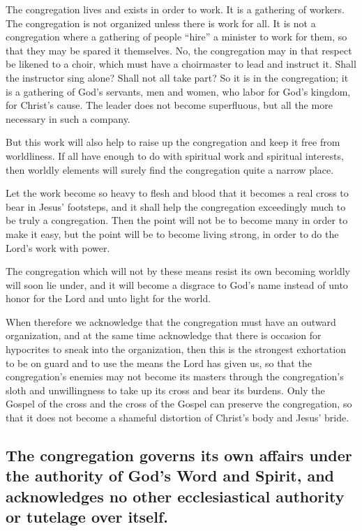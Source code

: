 The congregation lives and exists in order to work. It is a gathering of workers. The congregation is not organized unless there is work for all. It is not a congregation where a gathering of people “hire” a minister to work for them, so that they may be spared it themselves. No, the congregation may in that respect be likened to a choir, which must have a choirmaster to lead and instruct it. Shall the instructor sing alone? Shall not all take part? So it is in the congregation; it is a gathering of God’s servants, men and women, who labor for God’s kingdom, for Christ’s cause. The leader does not become superfluous, but all the more necessary in such a company.

But this work will also help to raise up the congregation and keep it free from worldliness. If all have enough to do with spiritual work and spiritual interests, then worldly elements will surely find the congregation quite a narrow place.

Let the work become so heavy to flesh and blood that it becomes a real cross to bear in Jesus’ footsteps, and it shall help the congregation exceedingly much to be truly a congregation. Then the point will not be to become many in order to make it easy, but the point will be to become living strong, in order to do the Lord’s work with power.

The congregation which will not by these means resist its own becoming worldly will soon lie under, and it will become a disgrace to God’s name instead of unto honor for the Lord and unto light for the world.

When therefore we acknowledge that the congregation must have an outward organization, and at the same time acknowledge that there is occasion for hypocrites to sneak into the organization, then this is the strongest exhortation to be on guard and to use the means the Lord has given us, so that the congregation’s enemies may not become its masters through the congregation’s sloth and unwillingness to take up its cross and bear its burdens. Only the Gospel of the cross and the cross of the Gospel can preserve the congregation, so that it does not become a shameful distortion of Christ’s body and Jesus’ bride.




\subsection{The congregation governs its own affairs under the authority of God’s Word and Spirit, and acknowledges no other ecclesiastical authority or tutelage over itself.}

